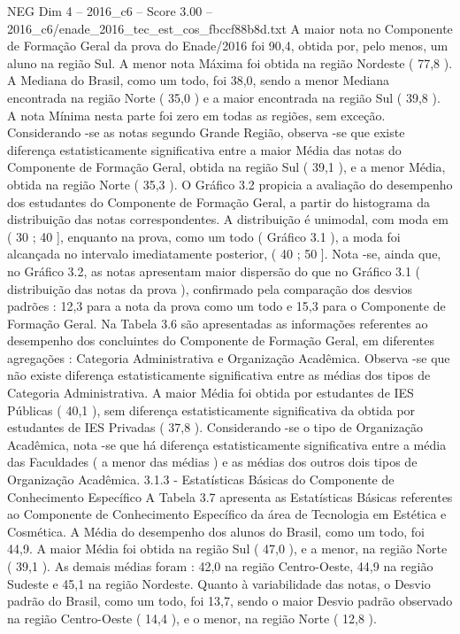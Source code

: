 \begin{textsample}{NEG Dim 4 – 2016\_c6 – Score 3.00 – 2016\_c6/enade\_2016\_tec\_est\_cos\_fbccf88b8d.txt}
A maior nota no Componente de Formação Geral da prova do Enade/2016 foi 90,4, obtida por, pelo menos, um aluno na região Sul.
A menor nota Máxima foi obtida na região Nordeste ( 77,8 ).
A Mediana do Brasil, como um todo, foi 38,0, sendo a menor Mediana encontrada na região Norte ( 35,0 ) e a maior encontrada na região Sul ( 39,8 ).
A nota Mínima nesta parte foi zero em todas as regiões, sem exceção.
Considerando -se as notas segundo Grande Região, observa -se que existe diferença estatisticamente significativa entre a maior Média das notas do Componente de Formação Geral, obtida na região Sul ( 39,1 ), e a menor Média, obtida na região Norte ( 35,3 ).
O Gráfico 3.2 propicia a avaliação do desempenho dos estudantes do Componente de Formação Geral, a partir do histograma da distribuição das notas correspondentes.
A distribuição é unimodal, com moda em ( 30 ; 40 ], enquanto na prova, como um todo ( Gráfico 3.1 ), a moda foi alcançada no intervalo imediatamente posterior, ( 40 ; 50 ].
Nota -se, ainda que, no Gráfico 3.2, as notas apresentam maior dispersão do que no Gráfico 3.1 ( distribuição das notas da prova ), confirmado pela comparação dos desvios padrões : 12,3 para a nota da prova como um todo e 15,3 para o Componente de Formação Geral.
Na Tabela 3.6 são apresentadas as informações referentes ao desempenho dos concluintes do Componente de Formação Geral, em diferentes agregações : Categoria Administrativa e Organização Acadêmica.
Observa -se que não existe diferença estatisticamente significativa entre as médias dos tipos de Categoria Administrativa.
A maior Média foi obtida por estudantes de IES Públicas ( 40,1 ), sem diferença estatisticamente significativa da obtida por estudantes de IES Privadas ( 37,8 ).
Considerando -se o tipo de Organização Acadêmica, nota -se que há diferença estatisticamente significativa entre a média das Faculdades ( a menor das médias ) e as médias dos outros dois tipos de Organização Acadêmica. 3.1.3 - Estatísticas Básicas do Componente de Conhecimento Específico A Tabela 3.7 apresenta as Estatísticas Básicas referentes ao Componente de Conhecimento Específico da área de Tecnologia em Estética e Cosmética.
A Média do desempenho dos alunos do Brasil, como um todo, foi 44,9.
A maior Média foi obtida na região Sul ( 47,0 ), e a menor, na região Norte ( 39,1 ).
As demais médias foram : 42,0 na região Centro-Oeste, 44,9 na região Sudeste e 45,1 na região Nordeste.
Quanto à variabilidade das notas, o Desvio padrão do Brasil, como um todo, foi 13,7, sendo o maior Desvio padrão observado na região Centro-Oeste ( 14,4 ), e o menor, na região Norte ( 12,8 ).

\end{textsample}
